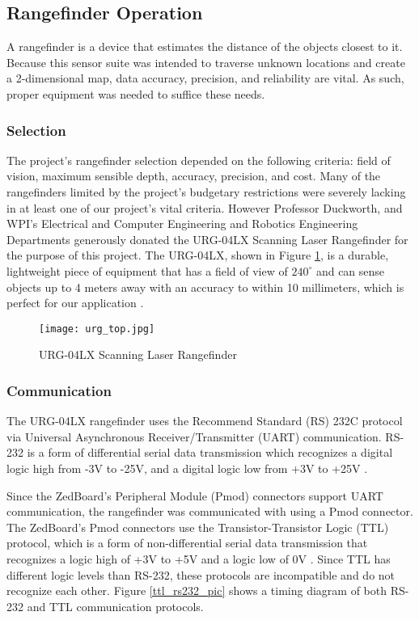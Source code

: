 \subsection{Rangefinder Operation}
A rangefinder is a device that estimates the distance of the objects closest to it. Because this sensor suite was intended to traverse unknown locations and create a 2-dimensional map, data accuracy, precision, and reliability are vital. As such, proper equipment was needed to suffice these needs. 

\subsubsection{Selection}
The project's rangefinder selection depended on the following criteria: field of vision, maximum sensible depth, accuracy, precision, and cost. Many of the rangefinders limited by the project's budgetary restrictions were severely lacking in at least one of our project's vital criteria. However Professor Duckworth, and WPI's Electrical and Computer Engineering and Robotics Engineering Departments generously donated the URG-04LX Scanning Laser Rangefinder for the purpose of this project. The URG-04LX, shown in Figure \ref{rangefinder_pic}, is a durable, lightweight piece of equipment that has a field of view of $240^\circ$ and can sense objects up to 4 meters away with an accuracy to within 10 millimeters, which is perfect for our application \cite{urg04lx_specifications}.

\begin{figure}[H]
	\centerline{\texttt{[image: urg\_top.jpg]}}
	\caption{URG-04LX Scanning Laser Rangefinder \cite{rangefinder_photo}}
	\label{rangefinder_pic}
\end{figure}

\subsubsection{Communication} \label{sssec:rangefinder_communication}
The URG-04LX rangefinder uses the Recommend Standard (RS) 232C protocol via Universal Asynchronous Receiver/Transmitter (UART) communication. RS-232 is a form of differential serial data transmission which recognizes a digital logic high from -3V to -25V, and a digital logic low from +3V to +25V \cite{rs232}.
\par
Since the ZedBoard's Peripheral Module (Pmod) connectors support UART communication, the rangefinder was communicated with using a Pmod connector. The ZedBoard's Pmod connectors use the Transistor-Transistor Logic (TTL) protocol, which is a form of non-differential serial data transmission that recognizes a logic high of +3V to +5V and a logic low of 0V \cite{ttl}. Since TTL has different logic levels than RS-232, these protocols are incompatible and do not recognize each other. Figure \ref{ttl_rs232_pic} shows a timing diagram of both RS-232 and TTL communication protocols.

